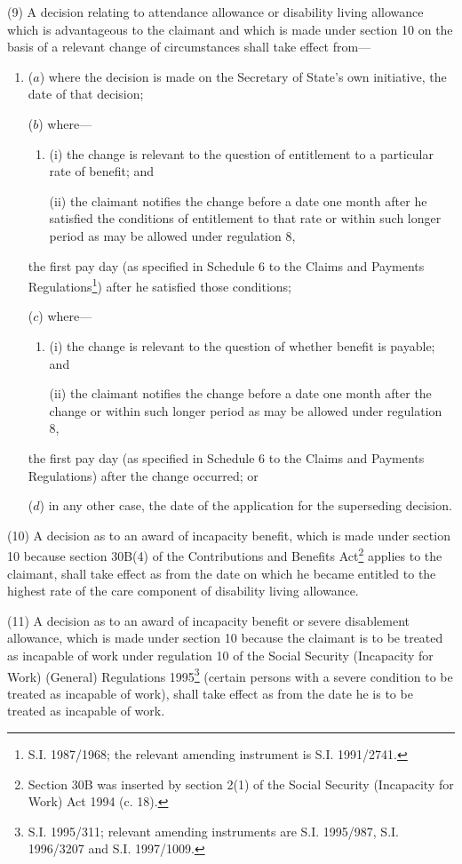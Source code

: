 \documentclass[12pt,a4paper]{article}
\begin{document}
(9) A decision relating to attendance allowance or disability living allowance which is advantageous to the claimant and which is made under section 10 on the basis of a relevant change of circumstances shall take effect from—
\begin{enumerate}\item[]
($a$) where the decision is made on the Secretary of State’s own initiative, the date of that decision;

($b$) where—
\begin{enumerate}\item[]
(i) the change is relevant to the question of entitlement to a particular rate of benefit; and

(ii) the claimant notifies the change before a date one month after he satisfied the conditions of entitlement to that rate or within such longer period as may be allowed under regulation 8,
\end{enumerate}
the first pay day (as specified in Schedule 6 to the Claims and Payments Regulations\footnote{\frenchspacing S.I. 1987/1968; the relevant amending instrument is S.I. 1991/2741.}) after he satisfied those conditions;

($c$) where—
\begin{enumerate}\item[]
(i) the change is relevant to the question of whether benefit is payable; and

(ii) the claimant notifies the change before a date one month after the change or within such longer period as may be allowed under regulation 8,
\end{enumerate}
the first pay day (as specified in Schedule 6 to the Claims and Payments Regulations) after the change occurred; or

($d$) in any other case, the date of the application for the superseding decision.
\end{enumerate}

(10) A decision as to an award of incapacity benefit, which is made under section 10 because section 30B(4) of the Contributions and Benefits Act\footnote{\frenchspacing Section 30B was inserted by section 2(1) of the Social Security (Incapacity for Work) Act 1994 (c. 18).} applies to the claimant, shall take effect as from the date on which he became entitled to the highest rate of the care component of disability living allowance.

(11) A decision as to an award of incapacity benefit or severe disablement allowance, which is made under section 10 because the claimant is to be treated as incapable of work under regulation 10 of the Social Security (Incapacity for Work) (General) Regulations 1995\footnote{\frenchspacing S.I. 1995/311; relevant amending instruments are S.I. 1995/987, S.I. 1996/3207 and S.I. 1997/1009.} (certain persons with a severe condition to be treated as incapable of work), shall take effect as from the date he is to be treated as incapable of work.
\end{document}
